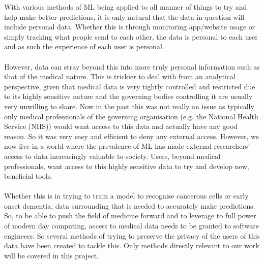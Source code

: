 With various methods of ML being applied to all manner of things to try and help make better predictions, it is only natural that the data in question will include personal data. 
Whether this is through monitoring app/website usage or simply tracking what people send to each other, the data is personal to each user and as such the experience of each user is personal. 
\\ \\
However, data can stray beyond this into more truly personal information such as that of the medical nature.
This is trickier to deal with from an analytical perspective, given that medical data is very tightly controlled and restricted due to its highly sensitive nature and the governing bodies controlling it are usually very unwilling to share. 
Now in the past this was not really an issue as typically only medical professionals of the governing organisation (e.g. the National Health Service (NHS)) would want access to this data and actually have any good reason. 
So it was very easy and efficient to deny any external access. 
However, we now live in a world where the prevalence of ML has made external researchers' access to data increasingly valuable to society. 
Users, beyond medical professionals, want access to this highly sensitive data to try and develop new, beneficial tools.
\\ \\
Whether this is in trying to train a model to recognise cancerous cells or early onset dementia, data surrounding that is needed to accurately make predictions. 
So, to be able to push the field of medicine forward and to leverage to full power of modern day computing, access to medical data needs to be granted to software engineers.
So several methods of trying to preserve the privacy of the users of this data have been created to tackle this. Only methods directly relevant to our work will be covered in this project.


